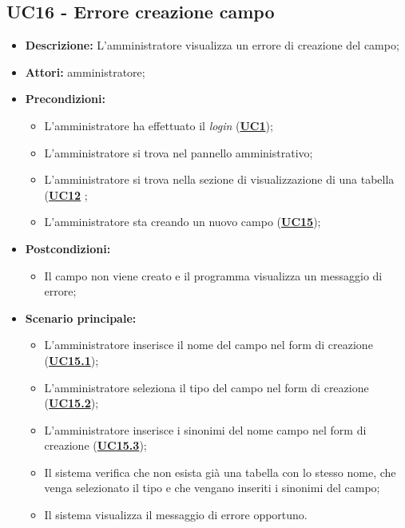 \subsection{UC16 - Errore creazione campo}
\label{sec:UC16}
\begin{itemize}
	\item \textbf{Descrizione:} L’amministratore visualizza un errore di creazione del campo;
	\item \textbf{Attori:} amministratore;
	\item \textbf{Precondizioni:} 
	\begin{itemize}
		\item L’amministratore ha effettuato il \textit{login} (\hyperref[sec:UC1]{\textbf{UC1}});
		\item L’amministratore si trova nel pannello amministrativo;
		\item L’amministratore si trova nella sezione di visualizzazione di una tabella (\hyperref[sec:UC12]{\textbf{UC12}} ;
		\item L’amministratore sta creando un nuovo campo (\hyperref[sec:UC15]{\textbf{UC15}});
	\end{itemize}
	\item \textbf{Postcondizioni:} 
	\begin{itemize}
		\item Il campo non viene creato e il programma visualizza un messaggio di errore;
	\end{itemize}
	\item \textbf{Scenario principale:} 
	\begin{itemize}
		\item L’amministratore inserisce il nome del campo nel form di creazione (\hyperref[sec:UC15.1]{\textbf{UC15.1}});
		\item L’amministratore seleziona il tipo del campo nel form di creazione (\hyperref[sec:UC15.2]{\textbf{UC15.2}});
		\item L’amministratore inserisce i sinonimi del nome campo nel form di creazione (\hyperref[sec:UC15.3]{\textbf{UC15.3}});
		\item Il sistema verifica che non esista già una tabella con lo stesso nome, che venga selezionato il tipo e che vengano inseriti i sinonimi del campo;
		\item Il sistema visualizza il messaggio di errore opportuno.
	\end{itemize}
\end{itemize}

